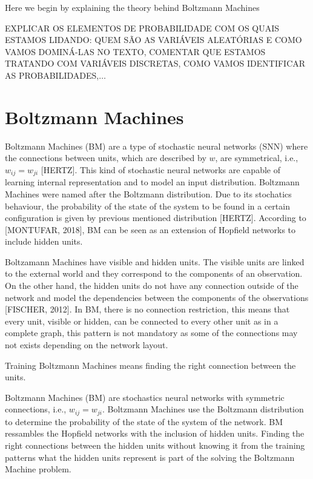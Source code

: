 Here we begin by explaining the theory behind Boltzmann Machines

EXPLICAR OS ELEMENTOS DE PROBABILIDADE COM OS QUAIS ESTAMOS LIDANDO:%
QUEM S\~{A}O AS VARI\'{A}VEIS ALEAT\'{O}RIAS E COMO VAMOS DOMIN\'{A}-LAS NO TEXTO, 
COMENTAR QUE ESTAMOS TRATANDO COM VARI\'{A}VEIS DISCRETAS, COMO VAMOS IDENTIFICAR AS PROBABILIDADES,$\ldots$




\section{Boltzmann Machines}

Boltzmann Machines (BM) are a type of stochastic neural networks (SNN) where the connections between units, which are described by $w$, are symmetrical, i.e., $w_{ij} = w_{ji}$ [HERTZ]. 
This kind of stochastic neural networks are capable of learning internal representation and to model an input distribution. 
Boltzmann Machines were named after the Boltzmann distribution. 
Due to its stochatics behaviour, the probability of the state of the system to be found in a certain configuration is given by previous mentioned distribution [HERTZ]. 
According to [MONTUFAR, 2018], BM can be seen as an extension of Hopfield networks to include hidden units.


Boltzamann Machines have visible and hidden units. 
The visible units are linked to the external world and they correspond to the components of an observation. On the other hand, the hidden units do not have any connection outside of the network and model the dependencies between the components of the observations [FISCHER, 2012]. 
In BM, there is no connection restriction, this means that every unit, visible or hidden, can be connected to every other unit as in a complete graph, this pattern is not mandatory as some of the connections may not exists depending on the network layout.

Training Boltzmann Machines means finding the right connection between the units.

Boltzmann Machines (BM) are stochastics neural networks with symmetric connections, i.e., $w_{ij} = w_{ji}$. 
Boltzmann Machines use the Boltzmann distribution to determine the probability of the state of the system of the network. 
BM ressambles the Hopfield networks with the inclusion of hidden units. 
Finding the right connections between the hidden units without knowing it from the training patterns what the hidden units represent is part of the solving the Boltzmann Machine problem.

